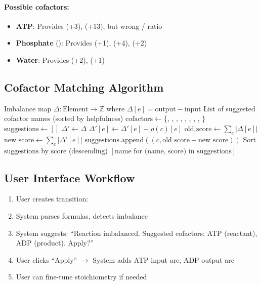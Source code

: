 \paragraph{Possible cofactors:}
\begin{itemize}
    \item \textbf{ATP}: Provides  (+3),  (+13), but wrong / ratio
    \item \textbf{Phosphate} (): Provides  (+1),  (+4),  (+2)
    \item \textbf{Water}: Provides  (+2),  (+1)
\end{itemize}

\subsection{Cofactor Matching Algorithm}
\label{subsec:cofactor-matching}

\begin{algorithm}[htbp]
\caption{Suggest cofactors to balance imbalance}
\label{alg:suggest-cofactors}
\begin{algorithmic}[1]
\Require Imbalance map $\Delta: \text{Element} \to \mathbb{Z}$ where $\Delta[e] = \text{output} - \text{input}$
\Ensure List of suggested cofactor names (sorted by helpfulness)
\State $\text{cofactors} \gets \{$, , , , , , , , $\}$
\State $\text{suggestions} \gets []$
    \State $\Delta' \gets \Delta$ 
        \State $\Delta'[e] \gets \Delta'[e] - \rho(c)[e]$
    \EndFor
    \State $\text{old\_score} \gets \sum_{e} |\Delta[e]|$
    \State $\text{new\_score} \gets \sum_{e} |\Delta'[e]|$
        \State $\text{suggestions}.\text{append}((c, \text{old\_score} - \text{new\_score}))$
    \EndIf
\EndFor
\State Sort $\text{suggestions}$ by score (descending)
\State \Return $[\text{name for (name, score) in suggestions}]$
\end{algorithmic}
\end{algorithm}

\subsection{User Interface Workflow}
\label{subsec:cofactor-ui}

\begin{enumerate}
    \item User creates transition: 
    \item System parses formulas, detects imbalance
    \item System suggests: ``Reaction imbalanced. Suggested cofactors: ATP (reactant), ADP (product). Apply?''
    \item User clicks ``Apply'' $\to$ System adds ATP input arc, ADP output arc
    \item User can fine-tune stoichiometry if needed
\end{enumerate}

